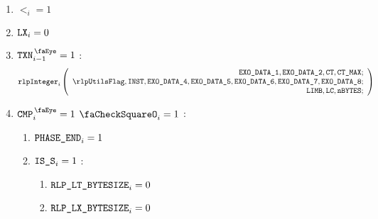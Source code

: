 \begin{center}
\end{center}
\begin{enumerate}
    \item $\lt_{i} =1$
    \item $\texttt{LX}_{i} =0$
    \item \If $\isTxn_{i-1} =1$ \Then:
        \[
            \rlpInteger_{i}
            \left(
            \begin{array}{r}
                \exoDataColumn{1},
                \exoDataColumn{2},
                \ct,
                \maxCt; \\
                \rlpUtilsFlag,
                \INST,
                \exoDataColumn{4},
                \exoDataColumn{5},
                \exoDataColumn{6},
                \exoDataColumn{7},
                \exoDataColumn{8}; \\
                \limb,
                \lc,
                \limbsize; \\
            \end{array}
            \right)
        \]
    \item \If $\isCmp_{i} =1$ \et $\done_{i}=1$ \Then:
        \begin{enumerate}
            \item $\texttt{PHASE\_END}_{i}=1$
            \item \If $\texttt{IS\_S}_{i}=1$ \Then:
                \begin{enumerate}
                    \item $\texttt{RLP\_LT\_BYTESIZE}_{i} = 0$
                    \item $\texttt{RLP\_LX\_BYTESIZE}_{i} = 0$ 
                \end{enumerate}
        \end{enumerate}
\end{enumerate}
